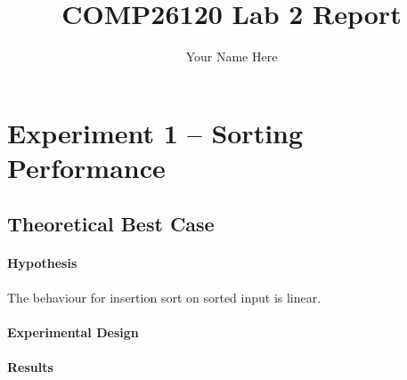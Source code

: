 \documentclass[a4]{article}
\title{COMP26120 Lab 2 Report}
\author{Your Name Here}
\begin{document}
\maketitle

\section{Experiment 1 -- Sorting Performance}

\subsection{Theoretical Best Case}

\paragraph{Hypothesis} The behaviour for insertion sort on sorted input is linear. 


\paragraph{Experimental Design} 










\paragraph{Results} 
\end{document}

